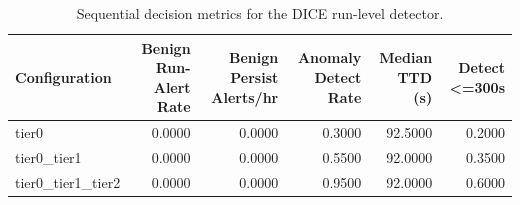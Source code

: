 \begin{table}[t]
\centering
\caption{Sequential decision metrics for the DICE run-level detector.}
\label{tab:dice_sequential_metrics}
\footnotesize
\begin{tabular}{lrrrrr}
\toprule
Configuration & Benign Run-Alert Rate & Benign Persist Alerts/hr & Anomaly Detect Rate & Median TTD (s) & Detect <=300s \\
\midrule
tier0 & 0.0000 & 0.0000 & 0.3000 & 92.5000 & 0.2000 \\
tier0_tier1 & 0.0000 & 0.0000 & 0.5500 & 92.0000 & 0.3500 \\
tier0_tier1_tier2 & 0.0000 & 0.0000 & 0.9500 & 92.0000 & 0.6000 \\
\bottomrule
\end{tabular}

\end{table}

